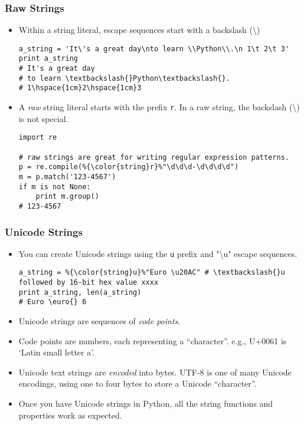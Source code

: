 \documentclass{beamer}
\begin{document}
\begin{frame}[fragile]
\frametitle{Raw Strings}
\begin{itemize}
\item Within a string literal, escape sequences start
      with a backslash (\textbackslash)
\begin{lstlisting}
a_string = 'It\'s a great day\nto learn \\Python\\.\n 1\t 2\t 3'
print a_string
# It's a great day
# to learn \textbackslash{}Python\textbackslash{}.
# 1\hspace{1cm}2\hspace{1cm}3
\end{lstlisting}

\item A \emph{raw} string literal starts with the prefix
      \lstinline{r}. In a raw string, the backslash
      (\textbackslash) is not special.
\begin{lstlisting}[escapechar=\%]
import re

# raw strings are great for writing regular expression patterns.
p = re.compile(%{\color{string}r}%"\d\d\d-\d\d\d\d")
m = p.match('123-4567')
if m is not None:
    print m.group()
# 123-4567
\end{lstlisting}
\end{itemize}
\end{frame}
 
\begin{frame}[fragile]
\frametitle{Unicode Strings}
\begin{itemize}
\item<1-> You can create Unicode strings using the \lstinline{u} prefix
      and "\textbackslash{}u" escape sequences. 
\begin{lstlisting}[escapechar=\%]
a_string = %{\color{string}u}%"Euro \u20AC" # \textbackslash{}u followed by 16-bit hex value xxxx
print a_string, len(a_string)
# Euro \euro{} 6
\end{lstlisting}
\item<2-> Unicode strings are sequences of \emph{code points}.
\item<2-> Code points are numbers, each representing a ``character''.
      e.g., U+0061 is `Latin small letter a'.
\item<2-> Unicode text strings are \emph{encoded} into
      bytes. UTF-8 is one of many Unicode encodings,
      using one to four bytes to store a Unicode ``character''.
\item<2-> Once you have Unicode strings in Python,
      all the string functions and properties work as expected.
\end{itemize}
\end{frame}
 
\end{document}
